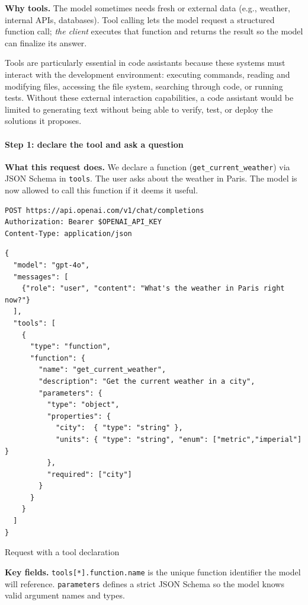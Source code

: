 \documentclass[english]{article}
\begin{document}
\noindent\textbf{Why tools.}
The model sometimes needs fresh or external data (e.g., weather, internal APIs, databases). Tool calling lets the model request a structured function call; \emph{the client} executes that function and returns the result so the model can finalize its answer.

Tools are particularly essential in code assistants because these systems must interact with the development environment: executing commands, reading and modifying files, accessing the file system, searching through code, or running tests. Without these external interaction capabilities, a code assistant would be limited to generating text without being able to verify, test, or deploy the solutions it proposes.

\paragraph{Step 1: declare the tool and ask a question}

\noindent\textbf{What this request does.}
We declare a function (\texttt{get\_current\_weather}) via JSON Schema in \texttt{tools}. The user asks about the weather in Paris. The model is now allowed to call this function if it deems it useful.

\begin{listing}[H]
\begin{verbatim}
POST https://api.openai.com/v1/chat/completions
Authorization: Bearer $OPENAI_API_KEY
Content-Type: application/json
\end{verbatim}
\begin{verbatim}
{
  "model": "gpt-4o",
  "messages": [
    {"role": "user", "content": "What's the weather in Paris right now?"}
  ],
  "tools": [
    {
      "type": "function",
      "function": {
        "name": "get_current_weather",
        "description": "Get the current weather in a city",
        "parameters": {
          "type": "object",
          "properties": {
            "city":  { "type": "string" },
            "units": { "type": "string", "enum": ["metric","imperial"] }
          },
          "required": ["city"]
        }
      }
    }
  ]
}
\end{verbatim}
\caption{Request with a tool declaration}
\end{listing}

\noindent\textbf{Key fields.}
\texttt{tools[*].function.name} is the unique function identifier the model will reference. \texttt{parameters} defines a strict JSON Schema so the model knows valid argument names and types.
\end{document}
